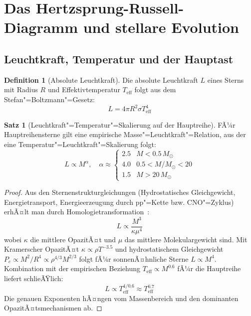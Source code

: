 ﻿\documentclass[a4paper,12pt]{article}
\theoremstyle{definition}
\newtheorem{definition}{Definition}
\newtheorem{satz}{Satz}
\begin{document}
\section{Das Hertzsprung-Russell-Diagramm und stellare Evolution}

\subsection{Leuchtkraft, Temperatur und der Hauptast}

\begin{definition}[Absolute Leuchtkraft]
    Die absolute Leuchtkraft $L$ eines Sterns mit Radius $R$ und
    Effektivtemperatur $T_{\text{eff}}$ folgt aus dem Stefan"=Boltzmann"=Gesetz:
    \[
        L = 4\pi R^2 \sigma T_{\text{eff}}^4
    \]
\end{definition}

\begin{satz}[Leuchtkraft"=Temperatur"=Skalierung auf der Hauptreihe]
\label{satz:hr}
    FÃ¼r Hauptreihensterne gilt eine empirische Masse"=Leuchtkraft"=Relation,
    aus der eine Temperatur"=Leuchtkraft"=Skalierung folgt:
    \[
        L \propto M^\alpha, \quad \alpha \approx \begin{cases} 2.5 & M < 0.5\,M_\odot \\ 4.0 & 0.5 < M/M_\odot < 20 \\ 1.5 & M > 20\,M_\odot \end{cases}
    \]
\end{satz}

\begin{proof}
    Aus den Sternenstrukturgleichungen (Hydrostatisches Gleichgewicht,
    Energietransport, Energieerzeugung durch pp"=Kette bzw. CNO"=Zyklus)
    erhÃ¤lt man durch Homologietransformation~\cite{salaris2005}:
    \[
        L \propto \frac{M^3}{\kappa \mu^4}
    \]
    wobei $\kappa$ die mittlere OpazitÃ¤t und $\mu$ das mittlere
    Molekulargewicht sind. Mit Kramerscher OpazitÃ¤t $\kappa \propto \rho T^{-3.5}$
    und hydrostatischem Gleichgewicht $P_c \propto M^2/R^4 \propto \rho^{4/3} M^{2/3}$
    folgt fÃ¼r sonnenÃ¤hnliche Sterne $L \propto M^4$.
    Kombination mit der empirischen Beziehung $T_{\text{eff}} \propto M^{0.6}$
    fÃ¼r die Hauptreihe liefert schlieÃŸlich:
    \[
        L \propto T_{\text{eff}}^{4/0.6} \approx T_{\text{eff}}^{6.7}
    \]
    Die genauen Exponenten hÃ¤ngen vom Massenbereich und den dominanten
    OpazitÃ¤tsmechanismen ab. \qedhere
\end{proof}
\end{document}
